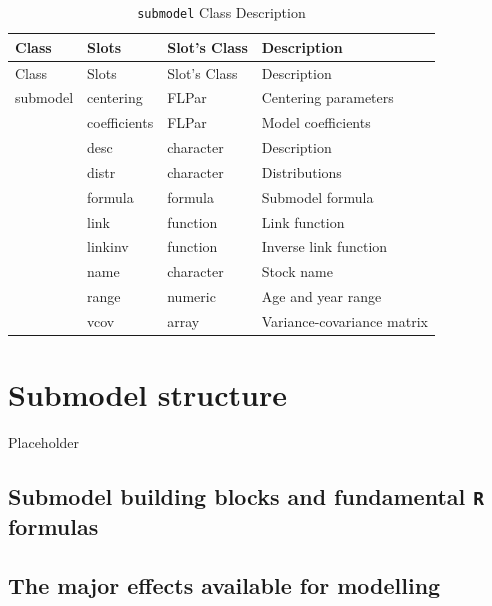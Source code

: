 \documentclass[
]{book}
\begin{document}
\begin{longtable}[]{@{}llll@{}}
\caption{\label{tab:submodelclass} \texttt{submodel} Class Description}\tabularnewline
\toprule\noalign{}
Class & Slots & Slot's Class & Description \\
\midrule\noalign{}
\endfirsthead
\toprule\noalign{}
Class & Slots & Slot's Class & Description \\
\midrule\noalign{}
\endhead
\bottomrule\noalign{}
\endlastfoot
submodel & centering & FLPar & Centering parameters \\
& coefficients & FLPar & Model coefficients \\
& desc & character & Description \\
& distr & character & Distributions \\
& formula & formula & Submodel formula \\
& link & function & Link function \\
& linkinv & function & Inverse link function \\
& name & character & Stock name \\
& range & numeric & Age and year range \\
& vcov & array & Variance-covariance matrix \\
\end{longtable}

\hypertarget{submodel-structure}{%
\chapter{\texorpdfstring{Submodel structure \label{sec:submod}}{Submodel structure }}\label{submodel-structure}}

Placeholder

\hypertarget{submodel-building-blocks-and-fundamental-r-formulas}{%
\section{\texorpdfstring{Submodel building blocks and fundamental \texttt{R} formulas}{Submodel building blocks and fundamental R formulas}}\label{submodel-building-blocks-and-fundamental-r-formulas}}

\hypertarget{the-major-effects-available-for-modelling}{%
\section{The major effects available for modelling}\label{the-major-effects-available-for-modelling}}
\end{document}
